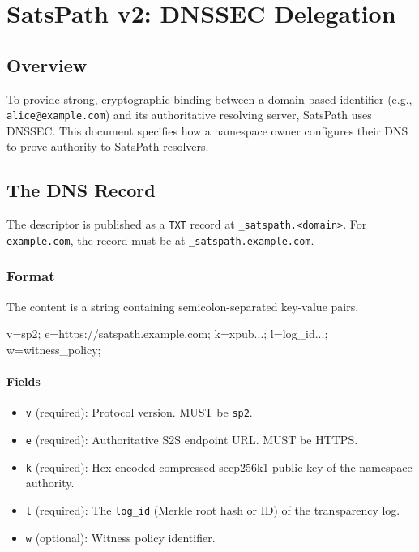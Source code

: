 \documentclass[
]{article}
\author{}
\date{}
\newenvironment{Shaded}{}{}
\newcommand{\NormalTok}[1]{#1}
\providecommand{\tightlist}{%
  \setlength{\itemsep}{0pt}\setlength{\parskip}{0pt}}
\begin{document}
\hypertarget{satspath-v2-dnssec-delegation}{%
\section{SatsPath v2: DNSSEC
Delegation}\label{satspath-v2-dnssec-delegation}}

\hypertarget{overview}{%
\subsection{Overview}\label{overview}}

To provide strong, cryptographic binding between a domain-based
identifier (e.g., \texttt{alice@example.com}) and its authoritative
resolving server, SatsPath uses DNSSEC. This document specifies how a
namespace owner configures their DNS to prove authority to SatsPath
resolvers.

\hypertarget{the-dns-record}{%
\subsection{The DNS Record}\label{the-dns-record}}

The descriptor is published as a \texttt{TXT} record at
\texttt{\_satspath.\textless{}domain\textgreater{}}. For
\texttt{example.com}, the record must be at
\texttt{\_satspath.example.com}.

\hypertarget{format}{%
\subsubsection{Format}\label{format}}

The content is a string containing semicolon-separated key-value pairs.

\begin{Shaded}
\begin{Highlighting}[]
\NormalTok{v=sp2; e=https://satspath.example.com; k=xpub...; l=log\_id...; w=witness\_policy;}
\end{Highlighting}
\end{Shaded}

\hypertarget{fields}{%
\paragraph{Fields}\label{fields}}

\begin{itemize}
\tightlist
\item
  \texttt{v} (required): Protocol version. MUST be \texttt{sp2}.
\item
  \texttt{e} (required): Authoritative S2S endpoint URL. MUST be HTTPS.
\item
  \texttt{k} (required): Hex-encoded compressed secp256k1 public key of
  the namespace authority.
\item
  \texttt{l} (required): The \texttt{log\_id} (Merkle root hash or ID)
  of the transparency log.
\item
  \texttt{w} (optional): Witness policy identifier.
\end{itemize}
\end{document}
